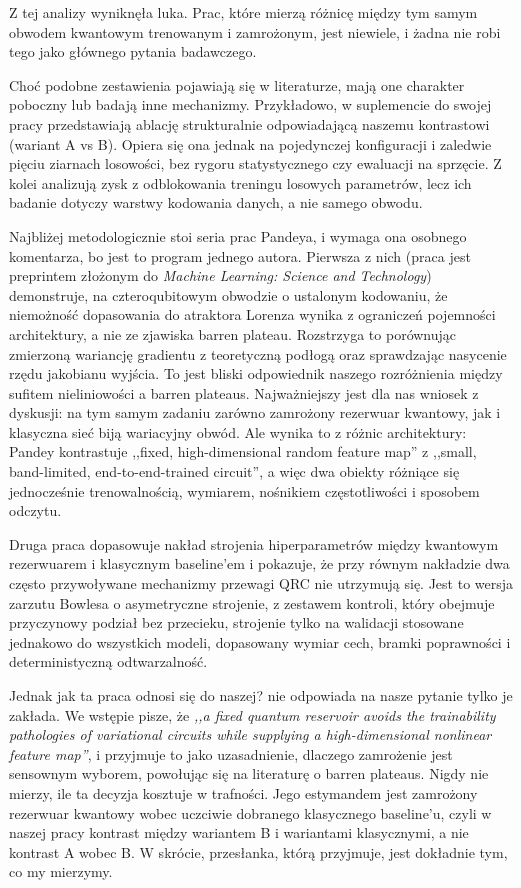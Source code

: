 \documentclass[11pt, a4paper]{article}
\begin{document}
Z tej analizy wyniknęła luka. Prac, które mierzą różnicę między tym samym obwodem kwantowym trenowanym i zamrożonym, jest niewiele, i żadna nie robi tego jako głównego pytania badawczego.

Choć podobne zestawienia pojawiają się w literaturze, mają one charakter poboczny lub badają inne mechanizmy. Przykładowo, \citet{raj2026} w suplemencie do swojej pracy przedstawiają ablację strukturalnie odpowiadającą naszemu kontrastowi (wariant A vs B). Opiera się ona jednak na pojedynczej konfiguracji i zaledwie pięciu ziarnach losowości, bez rygoru statystycznego czy ewaluacji na sprzęcie. Z kolei \citet{kodama2025} analizują zysk z odblokowania treningu losowych parametrów, lecz ich badanie dotyczy warstwy kodowania danych, a nie samego obwodu.

Najbliżej metodologicznie stoi seria prac Pandeya, i wymaga ona osobnego komentarza, bo jest to program jednego autora. Pierwsza z nich \citep{pandey2026a} (praca jest preprintem złożonym do \emph{Machine Learning: Science and Technology}) demonstruje, na czteroqubitowym obwodzie o ustalonym kodowaniu, że niemożność dopasowania do atraktora Lorenza wynika z ograniczeń pojemności architektury, a nie ze zjawiska barren plateau. Rozstrzyga to porównując zmierzoną wariancję gradientu z teoretyczną podłogą oraz sprawdzając nasycenie rzędu jakobianu wyjścia. To jest bliski odpowiednik naszego rozróżnienia między sufitem nieliniowości a barren plateaus. Najważniejszy jest dla nas wniosek z dyskusji: na tym samym zadaniu zarówno zamrożony rezerwuar kwantowy, jak i klasyczna sieć biją wariacyjny obwód. Ale wynika to z różnic architektury: Pandey kontrastuje ,,fixed, high-dimensional random feature map'' z ,,small, band-limited, end-to-end-trained circuit'', a więc dwa obiekty różniące się jednocześnie trenowalnością, wymiarem, nośnikiem częstotliwości i sposobem odczytu.

Druga praca \citep{pandey2026b} dopasowuje nakład strojenia hiperparametrów między kwantowym rezerwuarem i klasycznym baseline'em i pokazuje, że przy równym nakładzie dwa często przywoływane mechanizmy przewagi QRC nie utrzymują się. Jest to  wersja zarzutu Bowlesa o asymetryczne strojenie, z zestawem kontroli, który obejmuje przyczynowy podział bez przecieku, strojenie tylko na walidacji stosowane jednakowo do wszystkich modeli, dopasowany wymiar cech, bramki poprawności i deterministyczną odtwarzalność.

Jednak jak ta praca odnosi się do naszej?  \citet{pandey2026b} nie odpowiada na nasze pytanie tylko je zakłada. We wstępie pisze, że \emph{,,a fixed quantum reservoir avoids the trainability pathologies of variational circuits while supplying a high-dimensional nonlinear feature map''}, i przyjmuje to jako uzasadnienie, dlaczego zamrożenie jest sensownym wyborem, powołując się na literaturę o barren plateaus. Nigdy nie mierzy, ile ta decyzja kosztuje w trafności. Jego estymandem jest zamrożony rezerwuar kwantowy wobec uczciwie dobranego klasycznego baseline'u, czyli w naszej pracy kontrast między wariantem B i wariantami klasycznymi, a nie kontrast A wobec B. W skrócie, przesłanka, którą \citet{pandey2026b} przyjmuje, jest dokładnie tym, co my mierzymy.
\end{document}
